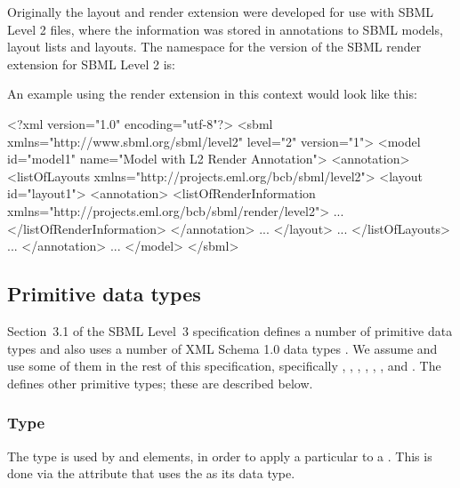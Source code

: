 Originally the layout and render extension were developed for use with SBML Level 2 files, where the information was stored in annotations to SBML models, layout lists and layouts.
The namespace for the version of the SBML render extension for SBML Level 2 is: 

\begin{center}
\end{center}

An example using the render extension in this context would look like this: 

\begin{example}
<?xml version="1.0" encoding="utf-8"?>
<sbml xmlns="http://www.sbml.org/sbml/level2" level="2" version="1">
  <model id="model1" name="Model with L2 Render Annotation">
    <annotation>
      <listOfLayouts xmlns="http://projects.eml.org/bcb/sbml/level2">
        <layout id="layout1">
          <annotation>
            <listOfRenderInformation xmlns="http://projects.eml.org/bcb/sbml/render/level2">
							...
            </listOfRenderInformation>
          </annotation>
					...
        </layout>
				...
      </listOfLayouts>
			...
    </annotation>
		...
  </model>
</sbml>
\end{example}

\subsection{Primitive data types}
\label{primitive-types}

Section~3.1 of the SBML Level~3 specification defines a number of
primitive data types and also uses a number of XML Schema 1.0 data types
\citep{biron:2000}. We assume and use some of them in the rest of this
specification, specifically , , , ,
, , and . The
\RenderPackage defines other primitive types; these are described below.


\subsubsection{Type \fixttspace{}}

The type  is used by \LocalStyle and \GlobalStyle elements, in order
to apply a particular \Style to a \GraphicalObject. This is done via the  attribute
that uses the  as its data type. 

